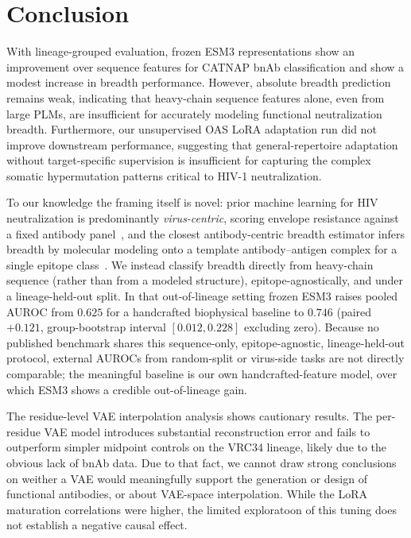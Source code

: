\section{Conclusion}
\label{sec:conclusion}

With lineage-grouped evaluation, frozen ESM3 representations show an
improvement over sequence features for CATNAP bnAb
classification and show a modest increase in breadth performance. However,
absolute breadth prediction remains weak, indicating that heavy-chain sequence
features alone, even from large PLMs, are insufficient for accurately modeling
functional neutralization breadth. Furthermore, our unsupervised OAS LoRA
adaptation run did not improve downstream performance, suggesting that
general-repertoire adaptation without target-specific supervision is
insufficient for capturing the complex somatic hypermutation patterns critical
to HIV-1 neutralization.

To our knowledge the framing itself is novel: prior machine learning for HIV
neutralization is predominantly \emph{virus-centric}, scoring envelope
resistance against a fixed antibody
panel~\cite{danaila2022review,igiraneza2024multitask,elanbari2025brave}, and the
closest antibody-centric breadth estimator infers breadth by molecular modeling
onto a template antibody--antigen complex for a single epitope
class~\cite{conti2019breadth}. We instead classify breadth directly from
heavy-chain sequence (rather than from a modeled structure), epitope-agnostically,
and under a lineage-held-out split. In
that out-of-lineage setting frozen ESM3 raises pooled AUROC from $0.625$ for a
handcrafted biophysical baseline to $0.746$ (paired $+0.121$, group-bootstrap
interval $[0.012,0.228]$ excluding zero). Because no published benchmark shares
this sequence-only, epitope-agnostic, lineage-held-out protocol, external AUROCs
from random-split or virus-side tasks are not directly comparable; the
meaningful baseline is our own handcrafted-feature model, over which ESM3 shows a
credible out-of-lineage gain.

The residue-level VAE interpolation analysis shows cautionary results. The
per-residue VAE model introduces substantial reconstruction error and fails to
outperform simpler midpoint controls on the VRC34 lineage, likely
due to the obvious lack of bnAb data. Due to that fact, we cannot draw
strong conclusions on weither a VAE would meaningfully
support the generation or design of functional antibodies, or
about VAE-space interpolation.
While the LoRA maturation correlations were higher,
the limited exploratoon of this tuning
does not establish a negative causal effect. 

